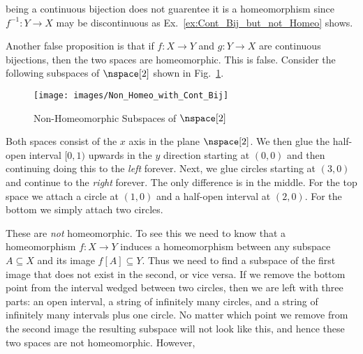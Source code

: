\documentclass{book}                                                           %
\begin{document}
                being a continuous bijection does not guarentee it is a
                homeomorphism since $f^{\minus{1}}:Y\rightarrow{X}$ may be
                discontinuous as Ex.~\ref{ex:Cont_Bij_but_not_Homeo} shows.
                \par\hfill\par
                Another false proposition is that if $f:X\rightarrow{Y}$ and
                $g:Y\rightarrow{X}$ are continuous bijections, then the two spaces
                are homeomorphic. This is false. Consider the following subspaces
                of $\nspace[2]$ shown in Fig.~\ref{fig:Non_Homeomorphic_Subspace}.
                \begin{figure}[H]
                    \centering
                    \captionsetup{type=figure}
                    \texttt{[image: images/Non\_Homeo\_with\_Cont\_Bij]}
                    \caption{Non-Homeomorphic Subspaces of $\nspace[2]$}
                    \label{fig:Non_Homeomorphic_Subspace}
                \end{figure}
                Both spaces consist of the $x$ axis in the plane $\nspace[2]$.
                We then glue the half-open interval $[0,1)$ upwards in the $y$
                direction starting at $(0,0)$ and then continuing doing this to
                the \textit{left} forever. Next, we glue circles starting at
                $(3,0)$ and continue to the \textit{right} forever. The only
                difference is in the middle. For the top space we attach a circle
                at $(1,0)$ and a half-open interval at $(2,0)$. For the bottom
                we simply attach two circles.
                \par\hfill\par
                These are \textit{not} homeomorphic. To see this we need to know
                that a homeomorphism $f:X\rightarrow{Y}$ induces a
                homeomorphism between any subspace $A\subseteq{X}$ and its image
                $f[A]\subseteq{Y}$. Thus we need to find a subspace of the first
                image that does not exist in the second, or vice versa. If we
                remove the bottom point from the interval wedged between two
                circles, then we are left with three parts: an open interval,
                a string of infinitely many circles, and a string of infinitely
                many intervals plus one circle. No matter which point we remove
                from the second image the resulting subspace will not look like
                this, and hence these two spaces are not homeomorphic. However,
\end{document}
